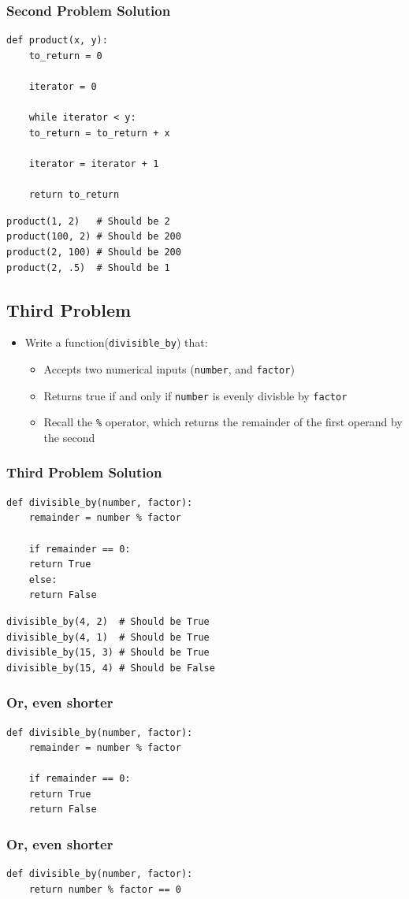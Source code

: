 \documentclass[11pt]{article}
\begin{document}
\subsubsection{Second Problem Solution}
\label{sec:org09386eb}
\begin{verbatim}
def product(x, y):
    to_return = 0

    iterator = 0

    while iterator < y:
	to_return = to_return + x

	iterator = iterator + 1

    return to_return
\end{verbatim}
\begin{verbatim}
product(1, 2)   # Should be 2
product(100, 2) # Should be 200
product(2, 100) # Should be 200
product(2, .5)  # Should be 1
\end{verbatim}
\subsection{Third Problem}
\label{sec:orga6ed0b2}
\begin{itemize}
\item Write a function(\texttt{divisible\_by}) that:
\begin{itemize}
\item Accepts two numerical inputs (\texttt{number}, and \texttt{factor})
\item Returns true if and only if \texttt{number} is evenly divisble by \texttt{factor}
\item Recall the \texttt{\%} operator, which returns the remainder of the first operand by the second
\end{itemize}
\end{itemize}
\subsubsection{Third Problem Solution}
\label{sec:orgcaf45d2}
\begin{verbatim}
def divisible_by(number, factor):
    remainder = number % factor

    if remainder == 0:
	return True
    else:
	return False
\end{verbatim}
\begin{verbatim}
divisible_by(4, 2)  # Should be True
divisible_by(4, 1)  # Should be True
divisible_by(15, 3) # Should be True
divisible_by(15, 4) # Should be False
\end{verbatim}

\subsubsection{Or, even shorter}
\label{sec:org4aa6b5a}
\begin{verbatim}
def divisible_by(number, factor):
    remainder = number % factor

    if remainder == 0:
	return True
    return False
\end{verbatim}
\subsubsection{Or, even shorter}
\label{sec:org2b99f62}
\begin{verbatim}
def divisible_by(number, factor):
    return number % factor == 0
\end{verbatim}
\end{document}
